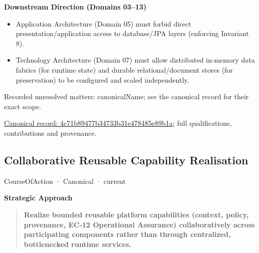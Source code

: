 \par\medskip\textbf{Downstream Direction (Domains 03–13)}\par


\begin{itemize}


\item Application Architecture (Domain 05) must forbid direct presentation/application access to database/JPA layers (enforcing Invariant 8).

\item Technology Architecture (Domain 07) must allow distributed in-memory data fabrics (for runtime state) and durable relational/document stores (for preservation) to be configured and scaled independently.

\end{itemize}

{\small Recorded unresolved matters: canonicalName; see the canonical record for their exact scope.}\par
{\footnotesize \href{../../../../continuum/strategy/course-of-action/4c71b89477b34733b31e478485e89b1a.md}{Canonical record: 4c71b89477b34733b31e478485e89b1a}; full qualifications, contributions and provenance.}\par
\subsection{Collaborative Reusable Capability Realisation}

\label{element:503939e1fa464b78b1d980ddedfeb3cf}
{\small CourseOfAction · Canonical · current}\par

\par\medskip\textbf{Strategic Approach}\par


\begin{quote}


\textbf{Realize bounded reusable platform capabilities (context, policy, provenance, EC-12 Operational Assurance) collaboratively across participating components rather than through centralized, bottlenecked runtime services.}



\end{quote}


